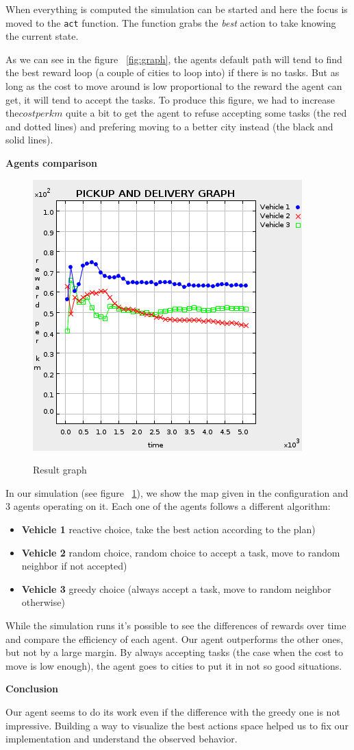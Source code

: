 \documentclass[11pt,a4paper]{article}
\begin{document}
When everything is computed the simulation can be started and here the focus is
moved to the \texttt{act} function. The function grabs the \emph{best} action
to take knowing the current state.

As we can see in the figure ~\ref{fig:graph}, the agents default path will tend
to find the best reward loop (a couple of cities to loop into) if there is no
tasks. But as long as the cost to move around is low proportional to the reward
the agent can get, it will tend to accept the tasks. To produce this figure, we
had to increase the$ cost per km$ quite a bit to get the agent to refuse accepting
some tasks (the red and dotted lines) and prefering moving to a better city
instead (the black and solid lines).

\bigskip
\textbf{Agents comparison}

\begin{figure}
    \includegraphics[width=.6\textwidth]{result.png}
    \caption{Result graph}{}
    \label{fig:result}
\end{figure}

In our simulation (see figure ~\ref{fig:result}), we show the map given in the
configuration and 3 agents operating on it. Each one of the agents follows a
different algorithm:

\begin{itemize}
    \item \textbf{Vehicle 1} reactive choice, take the best action according to the plan)
    \item \textbf{Vehicle 2} random choice, random choice to accept a task, move to
        random neighbor if not accepted)
    \item\textbf{Vehicle 3} greedy choice (always accept a task, move to random neighbor
        otherwise)
\end{itemize}

While the simulation runs it's possible to see the differences of rewards over
time and compare the efficiency of each agent. Our agent outperforms the other
ones, but not by a large margin. By always accepting tasks (the case when the
cost to move is low enough), the agent goes to cities to put it in not so good
situations.

\bigskip
\textbf{Conclusion}

Our agent seems to do its work even if the difference with the greedy one is
not impressive. Building a way to visualize the best actions space helped us to
fix our implementation and understand the observed behavior.
\end{document}
